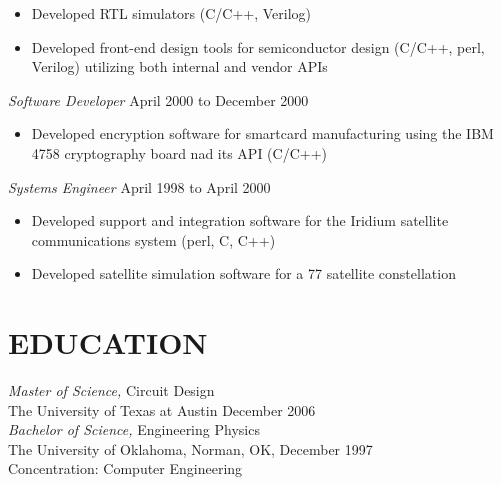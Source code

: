 \documentclass[margin]{res}
\begin{document}
\begin{resume}
\begin{itemize}
	\item Developed RTL simulators (C/C++, Verilog)
	\item Developed front-end design tools for semiconductor design (C/C++, perl, Verilog) utilizing both internal and vendor APIs
\end{itemize}
{\sl Software Developer} \hfill April 2000 to December 2000 \\
\begin{itemize}
	\item Developed encryption software for smartcard manufacturing using the IBM 4758 cryptography board nad its API (C/C++)
\end{itemize}
{\sl Systems Engineer} \hfill April 1998 to April 2000 \\
\begin{itemize}
	\item Developed support and integration software for the Iridium satellite communications system (perl, C, C++)
	\item Developed satellite simulation software for a 77 satellite constellation
\end{itemize}
\section{EDUCATION} 
{\sl Master of Science,} Circuit Design\\
                The University of Texas at Austin 
                December 2006 \\

{\sl Bachelor of Science,} Engineering Physics\\
                The University of Oklahoma, Norman, OK, 
                December 1997 \\
                Concentration: Computer Engineering\\
\end{resume}
\end{document}
